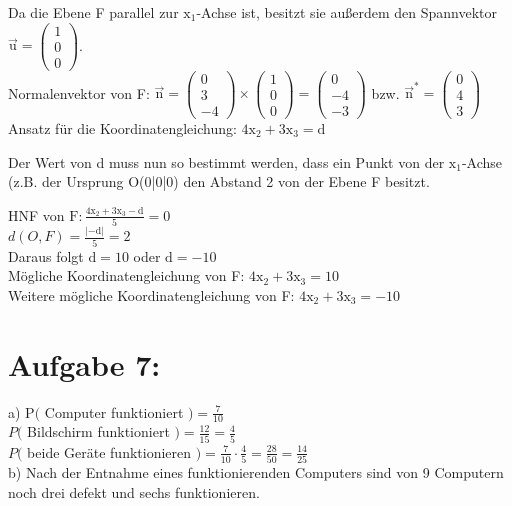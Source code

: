 \documentclass[10pt]{article}
\begin{document}
Da die Ebene F parallel zur $\mathrm{x}_{1}$-Achse ist, besitzt sie außerdem den Spannvektor $\overrightarrow{\mathrm{u}}=\left(\begin{array}{l}1 \\ 0 \\ 0\end{array}\right)$.\\
Normalenvektor von F: $\overrightarrow{\mathrm{n}}=\left(\begin{array}{c}0 \\ 3 \\ -4\end{array}\right) \times\left(\begin{array}{l}1 \\ 0 \\ 0\end{array}\right)=\left(\begin{array}{c}0 \\ -4 \\ -3\end{array}\right)$ bzw. $\overrightarrow{\mathrm{n}}^{*}=\left(\begin{array}{l}0 \\ 4 \\ 3\end{array}\right)$\\
Ansatz für die Koordinatengleichung: $4 \mathrm{x}_{2}+3 \mathrm{x}_{3}=\mathrm{d}$

Der Wert von d muss nun so bestimmt werden, dass ein Punkt von der $\mathrm{x}_{1}$-Achse (z.B. der Ursprung O(0|0|0) den Abstand 2 von der Ebene F besitzt.

HNF von $\mathrm{F}: \frac{4 \mathrm{x}_{2}+3 \mathrm{x}_{3}-\mathrm{d}}{5}=0$\\
$d(O, F)=\frac{|-\mathrm{d}|}{5}=2$\\
Daraus folgt $\mathrm{d}=10$ oder $\mathrm{d}=-10$\\
Mögliche Koordinatengleichung von F: $4 \mathrm{x}_{2}+3 \mathrm{x}_{3}=10$\\
Weitere mögliche Koordinatengleichung von F: $4 \mathrm{x}_{2}+3 \mathrm{x}_{3}=-10$

\section*{Aufgabe 7:}
a) $\mathrm{P}($ Computer funktioniert $)=\frac{7}{10}$\\
$P($ Bildschirm funktioniert $)=\frac{12}{15}=\frac{4}{5}$\\
$P($ beide Geräte funktionieren $)=\frac{7}{10} \cdot \frac{4}{5}=\frac{28}{50}=\frac{14}{25}$\\
b) Nach der Entnahme eines funktionierenden Computers sind von 9 Computern noch drei defekt und sechs funktionieren.
\end{document}
